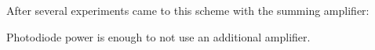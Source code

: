 
After several experiments came to this scheme with the summing amplifier:
\begin{center}
\end{center}

Photodiode power is enough to not use an additional amplifier.